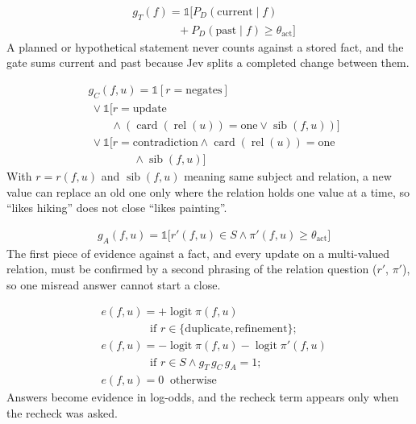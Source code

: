 \documentclass[11pt]{article}
\begin{document}
\begin{align}
& g_T(f) = \mathbb{1}\bigl[P_D(\text{current} \mid f) \nonumber\\
& \qquad\qquad + P_D(\text{past} \mid f) \ge \theta_{\text{act}}\bigr] \label{eq:gtemp}
\end{align}
A planned or hypothetical statement never counts against a stored fact, and the gate sums current and past because Jev splits a completed change between them.

\begin{align}
& g_C(f,u) = \mathbb{1}[r = \text{negates}] \nonumber\\
& \ \vee \mathbb{1}\bigl[r = \text{update} \nonumber\\
& \qquad \wedge (\operatorname{card}(\operatorname{rel}(u)) = \text{one} \vee \operatorname{sib}(f,u))\bigr] \nonumber\\
& \ \vee \mathbb{1}\bigl[r = \text{contradiction} \wedge \operatorname{card}(\operatorname{rel}(u)) = \text{one} \nonumber\\
& \qquad\qquad \wedge \operatorname{sib}(f,u)\bigr] \label{eq:gcard}
\end{align}
With $r = r(f,u)$ and $\operatorname{sib}(f,u)$ meaning same subject and relation, a new value can replace an old one only where the relation holds one value at a time, so ``likes hiking'' does not close ``likes painting''.

\begin{align}
& g_A(f,u) = \mathbb{1}\bigl[r'(f,u) \in S \wedge \pi'(f,u) \ge \theta_{\text{act}}\bigr] \label{eq:gagree}
\end{align}
The first piece of evidence against a fact, and every update on a multi-valued relation, must be confirmed by a second phrasing of the relation question ($r'$, $\pi'$), so one misread answer cannot start a close.

\begin{align}
& e(f,u) = +\operatorname{logit} \pi(f,u) \nonumber\\
& \qquad\qquad \text{ if } r \in \{\text{duplicate}, \text{refinement}\}; \nonumber\\
& e(f,u) = -\operatorname{logit} \pi(f,u) - \operatorname{logit} \pi'(f,u) \nonumber\\
& \qquad\qquad \text{ if } r \in S \wedge g_T\, g_C\, g_A = 1; \nonumber\\
& e(f,u) = 0 \ \text{ otherwise} \label{eq:evid}
\end{align}
Answers become evidence in log-odds, and the recheck term appears only when the recheck was asked.
\end{document}
